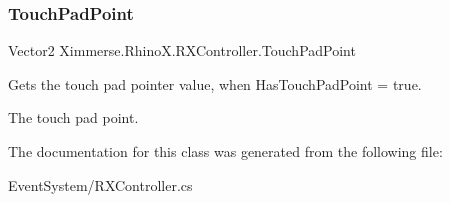 \subsubsection{\texorpdfstring{Touch\+Pad\+Point}{TouchPadPoint}}
{\footnotesize\ttfamily Vector2 Ximmerse.\+Rhino\+X.\+R\+X\+Controller.\+Touch\+Pad\+Point\hspace{0.3cm}{\ttfamily [get]}}



Gets the touch pad pointer value, when Has\+Touch\+Pad\+Point = true. 

The touch pad point.

The documentation for this class was generated from the following file\+:\begin{DoxyCompactItemize}
\item 
Event\+System/R\+X\+Controller.\+cs\end{DoxyCompactItemize}

